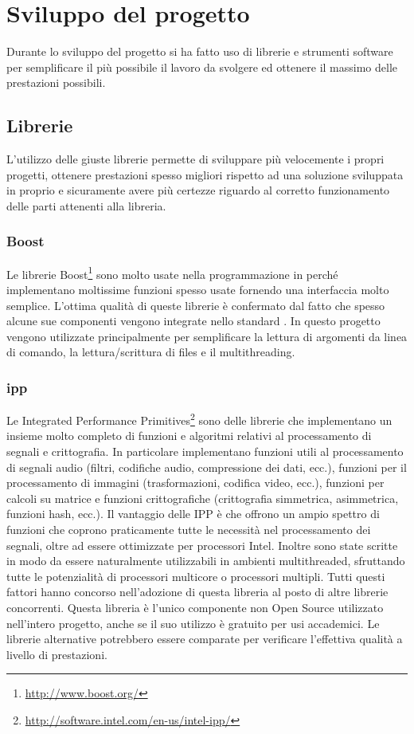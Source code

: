 \chapter{Sviluppo del progetto}
\label{sw_devel}

Durante lo sviluppo del progetto si ha fatto uso di librerie e strumenti
software per semplificare il pi\`u possibile il lavoro da svolgere ed ottenere
il massimo delle prestazioni possibili. 

\section{Librerie}
L'utilizzo delle giuste librerie permette di sviluppare pi\`u velocemente i
propri progetti, ottenere prestazioni spesso migliori rispetto ad una soluzione
sviluppata in proprio e sicuramente avere pi\`u certezze riguardo al corretto
funzionamento delle parti attenenti alla libreria.

\subsection{Boost}
Le librerie Boost\footnote{\url{http://www.boost.org/}} sono molto usate nella
programmazione in \CC perch\'e implementano moltissime funzioni spesso usate
fornendo una interfaccia molto semplice. L'ottima qualit\`a di queste librerie
\`e confermato dal fatto che spesso alcune sue componenti vengono integrate
nello standard \CC. In questo progetto vengono utilizzate principalmente per
semplificare la lettura di argomenti da linea di comando, la lettura/scrittura
di files e il multithreading.

\subsection{\ac{ipp}}
Le Integrated Performance
Primitives\footnote{\url{http://software.intel.com/en-us/intel-ipp/}} sono delle
librerie che implementano un insieme molto completo di funzioni e algoritmi
relativi al processamento di segnali e crittografia. In particolare implementano
funzioni utili al processamento di segnali audio (filtri, codifiche audio,
compressione dei dati, ecc.), funzioni per il processamento di immagini
(trasformazioni, codifica video, ecc.), funzioni per calcoli su matrice e
funzioni crittografiche (crittografia simmetrica, asimmetrica, funzioni hash,
ecc.).  Il vantaggio delle IPP \`e che offrono un ampio spettro di funzioni che
coprono praticamente tutte le necessit\`a nel processamento dei segnali, oltre
ad essere ottimizzate per processori Intel. Inoltre sono state scritte in modo
da essere naturalmente utilizzabili in ambienti multithreaded, sfruttando tutte
le potenzialit\`a di processori multicore o processori multipli. Tutti questi
fattori hanno concorso nell'adozione di questa libreria al posto di altre
librerie concorrenti. Questa libreria \`e l'unico componente non Open Source
utilizzato nell'intero progetto, anche se il suo utilizzo \`e gratuito per usi
accademici. Le librerie alternative potrebbero essere comparate per verificare
l'effettiva qualit\`a a livello di prestazioni.

